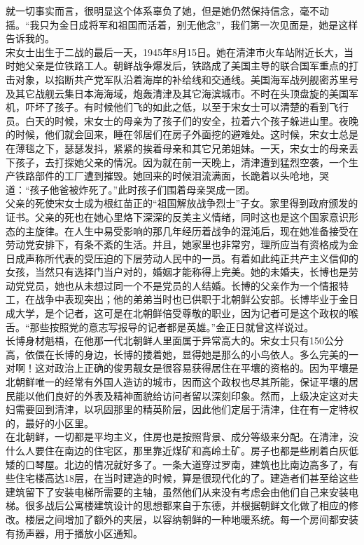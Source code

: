 就一切事实而言，很明显这个体系辜负了她，但是她仍然保持信念，毫不动摇。“我只为金日成将军和祖国而活着，别无他念”，我们第一次见面是，她是这样告诉我的。\\

宋女士出生于二战的最后一天，1945年8月15日。她在清津市火车站附近长大，当时她父亲是位铁路工人。朝鲜战争爆发后，铁路成了美国主导的联合国军重点的打击对象，以掐断共产党军队沿着海岸的补给线和交通线。美国海军战列舰密苏里号及其它战舰云集日本海海域，炮轰清津及其它海滨城市。不时在头顶盘旋的美国军机，吓坏了孩子。有时候他们飞的如此之低，以至于宋女士可以清楚的看到飞行员。白天的时候，宋女士的母亲为了孩子们的安全，拉着六个孩子躲进山里。夜晚的时候，他们就会回来，睡在邻居们在房子外面挖的避难处。这时候，宋女士总是在薄毯之下，瑟瑟发抖，紧紧的挨着母亲和其它兄弟姐妹。一天，宋女士的母亲丢下孩子，去打探她父亲的情况。因为就在前一天晚上，清津遭到猛烈空袭，一个生产铁路部件的工厂遭到摧毁。她回来的时候泪流满面，长跪着以头呛地，哭道：“孩子他爸被炸死了。”此时孩子们围着母亲哭成一团。\\

父亲的死使宋女士成为根红苗正的“祖国解放战争烈士”子女。家里得到政府颁发的证书。父亲的死也在她心里烙下深深的反美主义情绪，同时这也是这个国家意识形态的主旋律。在人生中易受影响的那几年经历着战争的混沌后，现在她准备接受在劳动党安排下，有条不紊的生活。并且，她家里也非常穷，理所应当有资格成为金日成声称所代表的受压迫的下层劳动人民中的一员。有着如此纯正共产主义信仰的女孩，当然只有选择门当户对的，婚姻才能称得上完美。她的未婚夫，长博也是劳动党党员，她也从未想过同一个不是党员的人结婚。长博的父亲作为一个情报特工，在战争中表现突出；他的弟弟当时也已供职于北朝鲜公安部。长博毕业于金日成大学，是个记者，这可是在北朝鲜倍受尊敬的职业，因为记者可是这个政权的喉舌。“那些按照党的意志写报导的记者都是英雄。”金正日就曾这样说过。\\

长博身材魁梧，在他那一代北朝鲜人里面属于异常高大的。宋女士只有150公分高，依偎在长博的身边，长博的搂着她，显得她是那么的小鸟依人。多么完美的一对啊！这对政治上正确的俊男靓女是很容易获得居住在平壤的资格的。因为平壤是北朝鲜唯一的经常有外国人造访的城市，因而这个政权也尽其所能，保证平壤的居民能以他们良好的外表及精神面貌给访问者留以深刻印象。然而，上级决定这对夫妇需要回到清津，以巩固那里的精英阶层，因此他们定居于清津，住在有一定特权的，最好的小区里。\\

在北朝鲜，一切都是平均主义，住房也是按照背景、成分等级来分配。在清津，没什么人要住在南边的住宅区，那里靠近煤矿和高岭土矿。房子也都是些刷着白灰低矮的口琴屋。北边的情况就好多了。一条大道穿过罗南，建筑也比南边高多了，有些住宅楼高达18层，在当时建造的时候，算是很现代化的了。建造者们甚至给这些建筑留下了安装电梯所需要的主轴，虽然他们从来没有考虑会由他们自己来安装电梯。很多战后公寓楼建筑设计的思想都来自于东德，并根据朝鲜文化做了相应的修改。楼层之间增加了额外的夹层，以容纳朝鲜的一种地暖系统。每一个房间都安装有扬声器，用于播放小区通知。\\

